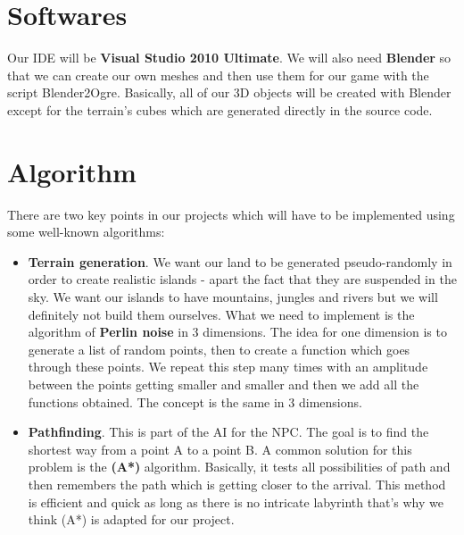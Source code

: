 \documentclass[article]{report} %
\begin{document}
						\section{Softwares}
							Our \ac{IDE} will be \textbf{Visual Studio 2010 Ultimate}. We will also need \textbf{Blender} so that we can create our own meshes and then use them for our game with the script Blender2Ogre. Basically, all of our 3D objects will be created with Blender except for the terrain’s cubes which are generated directly in the source code.
						\section{Algorithm}
							
							There are two key points in our projects which will have to be implemented using some well-known algorithms:
							\begin{itemize}
									\renewcommand{\labelitemi}{$\bullet$}
									\item \textbf{Terrain generation}. We want our land to be generated pseudo-randomly in order to create realistic islands - apart the fact that they are suspended in the sky. We want our islands to have mountains, jungles and rivers but we will definitely not build them ourselves. What we need to implement is the algorithm of \textbf{Perlin noise} in 3 dimensions. The idea for one dimension is to generate a list of random points, then to create a function which goes through these points. We repeat this step many times with an amplitude between the points getting smaller and smaller and then we add all the functions obtained. The concept is the same in 3 dimensions.\\

									\item \textbf{Pathfinding}. This is part of the \ac{AI} for the \ac{NPC}. The goal is to find the shortest way from a point A to a point B. A common solution for this problem is the \textbf{(A*)} algorithm. Basically, it tests all possibilities of path and then remembers the path which is getting closer to the arrival. This method is efficient and quick as long as there is no intricate labyrinth that’s why we think (A*) is adapted for our project.
							\end{itemize}

							\begin{acronym}
							\end{acronym}
     	     		
\end{document}
